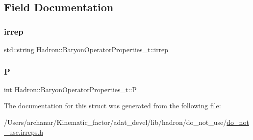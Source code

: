 \subsection{Field Documentation}
\mbox{\label{structHadron_1_1BaryonOperatorProperties__t_a4356cd638575da7c5dd5e43fdeed7130}} 
\subsubsection{\texorpdfstring{irrep}{irrep}}
{\footnotesize\ttfamily std\+::string Hadron\+::\+Baryon\+Operator\+Properties\+\_\+t\+::irrep}

\mbox{\label{structHadron_1_1BaryonOperatorProperties__t_abb8040bfa73ba989712f04a7d723da10}} 
\subsubsection{\texorpdfstring{P}{P}}
{\footnotesize\ttfamily int Hadron\+::\+Baryon\+Operator\+Properties\+\_\+t\+::P}



The documentation for this struct was generated from the following file\+:\begin{DoxyCompactItemize}
\item 
/\+Users/archanar/\+Kinematic\+\_\+factor/adat\+\_\+devel/lib/hadron/do\+\_\+not\+\_\+use/\mbox{\hyperlink{do__not__use_8irreps_8h}{do\+\_\+not\+\_\+use.\+irreps.\+h}}\end{DoxyCompactItemize}
